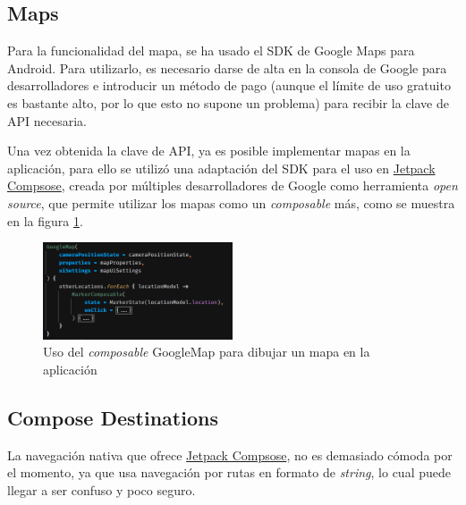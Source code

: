 \subsection{Maps}
Para la funcionalidad del mapa, se ha usado el
SDK de Google Maps para Android\hyperlink{cap:biblio}{}. Para utilizarlo, es necesario darse de alta en la consola de Google para desarrolladores e introducir un método de pago (aunque el límite de uso gratuito es bastante alto, por lo que esto no supone un problema) para recibir la clave de API necesaria.

Una vez obtenida la clave de API\hyperlink{cap:biblio}{}, ya es posible implementar mapas en la aplicación, para ello se utilizó una adaptación del SDK para el uso en \hyperlink{subsec:compose}{Jetpack Compsose}, creada por múltiples desarrolladores de Google como herramienta \textit{open source}, que permite utilizar los mapas como un \textit{composable} más, como se muestra en la figura \ref{fig:maps_compose}.
\begin{figure}[h]
	\centering
	\includegraphics[width = 0.5\textwidth]{Imagenes/Fuentes/maps_compose.png}
	\caption{Uso del \textit{composable} GoogleMap para dibujar un mapa en la aplicación}
	\label{fig:maps_compose}
\end{figure}

\subsection{Compose Destinations}
La navegación nativa que ofrece \hyperlink{subsec:compose}{Jetpack Compsose}, no es demasiado cómoda por el momento, ya que usa navegación por rutas en formato de \textit{string}, lo cual puede llegar a ser confuso y poco seguro. 

